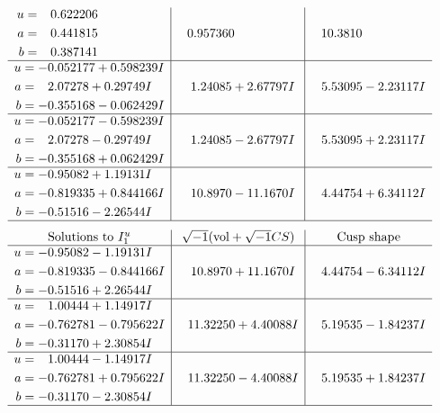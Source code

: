 \documentclass[1p]{elsarticle_modified}
\theoremstyle{definition}
\newcommand{\I}{\sqrt{-1}}
\begin{document}
$$\begin{array}{c|c|c}
\begin{aligned}
u &= \phantom{-}0.622206\phantom{ +0.000000I} \\
a &= \phantom{-}0.441815\phantom{ +0.000000I} \\
b &= \phantom{-}0.387141\phantom{ +0.000000I}\end{aligned}
 & \phantom{-}0.957360\phantom{ +0.000000I} & \phantom{-}10.3810\phantom{ +0.000000I} \\ \hline\begin{aligned}
u &= -0.052177 + 0.598239 I \\
a &= \phantom{-}2.07278 + 0.29749 I \\
b &= -0.355168 - 0.062429 I\end{aligned}
 & \phantom{-}1.24085 + 2.67797 I & \phantom{-}5.53095 - 2.23117 I \\ \hline\begin{aligned}
u &= -0.052177 - 0.598239 I \\
a &= \phantom{-}2.07278 - 0.29749 I \\
b &= -0.355168 + 0.062429 I\end{aligned}
 & \phantom{-}1.24085 - 2.67797 I & \phantom{-}5.53095 + 2.23117 I \\ \hline\begin{aligned}
u &= -0.95082 + 1.19131 I \\
a &= -0.819335 + 0.844166 I \\
b &= -0.51516 - 2.26544 I\end{aligned}
 & \phantom{-}10.8970 - 11.1670 I & \phantom{-}4.44754 + 6.34112 I\\
 \hline 
 \end{array}$$\newpage$$\begin{array}{c|c|c}  
\text{Solutions to }I^u_{1}& \I (\text{vol} + \sqrt{-1}CS) & \text{Cusp shape}\\
 \hline 
\begin{aligned}
u &= -0.95082 - 1.19131 I \\
a &= -0.819335 - 0.844166 I \\
b &= -0.51516 + 2.26544 I\end{aligned}
 & \phantom{-}10.8970 + 11.1670 I & \phantom{-}4.44754 - 6.34112 I \\ \hline\begin{aligned}
u &= \phantom{-}1.00444 + 1.14917 I \\
a &= -0.762781 - 0.795622 I \\
b &= -0.31170 + 2.30854 I\end{aligned}
 & \phantom{-}11.32250 + 4.40088 I & \phantom{-}5.19535 - 1.84237 I \\ \hline\begin{aligned}
u &= \phantom{-}1.00444 - 1.14917 I \\
a &= -0.762781 + 0.795622 I \\
b &= -0.31170 - 2.30854 I\end{aligned}
 & \phantom{-}11.32250 - 4.40088 I & \phantom{-}5.19535 + 1.84237 I\\
 \hline 
 \end{array}$$\newpage\newpage\renewcommand{\arraystretch}{1}
\end{document}
